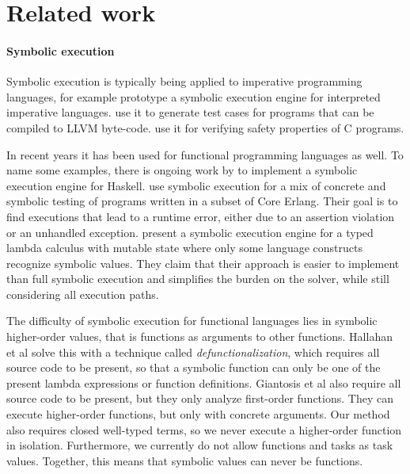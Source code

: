 


\section{Related work}
\label{sec:relatedwork}

\paragraph{Symbolic execution}
Symbolic execution \cite{King1975,Boyer1975} is typically being applied to imperative programming languages, for example \citet{BucurKC2014} prototype a symbolic execution engine for interpreted imperative languages.
\citet{CadarDE2008} use it to generate test cases for programs that can be compiled to LLVM byte-code.
\citet{JaffarMNS2012} use it for verifying safety properties of C programs.

In recent years it has been used for functional programming languages as well.
To name some examples, there is ongoing work by \citet{HallahanXP2017,DBLP:conf/pldi/HallahanXBJP19} to implement a symbolic execution engine for Haskell.
\citet{GiantsiosPS2017} use symbolic execution for a mix of concrete and symbolic testing of programs written in a subset of Core Erlang.
Their goal is to find executions that lead to a runtime error, either due to an assertion violation or an unhandled exception.
\citet{ChangKT2018} present a symbolic execution engine for a typed lambda calculus with mutable state where only some language constructs recognize symbolic values.
They claim that their approach is easier to implement than full symbolic execution and simplifies the burden on the solver, while still considering all execution paths.

The difficulty of symbolic execution for functional languages lies in symbolic higher-order values, that is functions as arguments to other functions.
Hallahan et al solve this with a technique called \emph{defunctionalization}, which requires all source code to be present, so that a symbolic function can only be one of the present lambda expressions or function definitions.
Giantosis et al also require all source code to be present, but they only analyze first-order functions.
They can execute higher-order functions, but only with concrete arguments.
Our method also requires closed well-typed terms, so we never execute a higher-order function in isolation.
Furthermore, we currently do not allow functions and tasks as task values.
Together, this means that symbolic values can never be functions.



